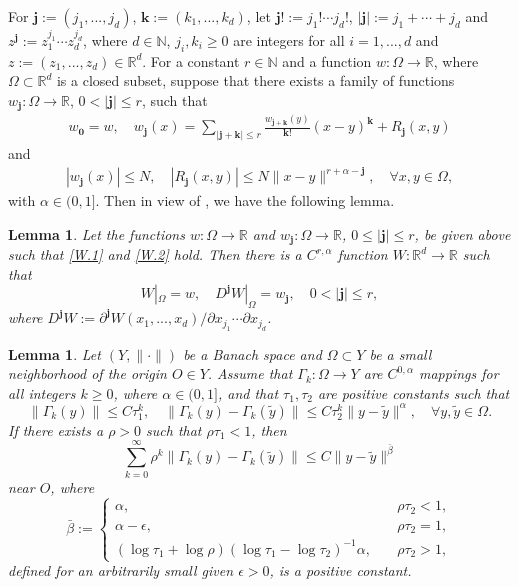 \documentclass[reqno]{amsart}
\numberwithin{equation}{section}
\newtheorem{lemma}[theorem]{Lemma}
\begin{document}
For $\mathbf{j}:=(j_1,...,j_d)$, $\mathbf{k}:=(k_1,...,k_d)$,
let $\mathbf{j}!:=j_1 ! \cdots j_d !$, $|\mathbf{j}|:=j_1+\cdots +j_d$
and $z^{\mathbf{j}}:=z_1^{j_1}\cdots z_d^{j_d}$, where $d\in\mathbb{N}$,
$j_i,k_i\ge 0$ are integers for all $i=1,...,d$ and $z:=(z_1,...,z_d)\in\mathbb{R}^d$.
For a constant $r\in\mathbb{N}$ and a function $w:\Omega \to \mathbb{R}$, where $\Omega\subset\mathbb{R}^d$ is a closed subset,
suppose that there exists a family of functions $w_{\mathbf{j}}:\Omega\to \mathbb{R}$, $0<|\mathbf{j}|\le r$, such that
\begin{align}\label{W.1} 
 w_{\mathbf{0}}=w, \quad w_{\mathbf{j}}(x)=\sum_{|\mathbf{j}+\mathbf{k}|\le r} \frac{w_{\mathbf{j}+\mathbf{k}}(y)}{\mathbf{k}!}(x-y)^{\mathbf{k}}+R_{\mathbf{j}}(x,y)
\end{align}
and
\begin{align}\label{W.2} 
  |w_{\mathbf{j}}(x) | \le N, \quad    |R_{\mathbf{j}}(x,y)|\le N \|x-y\|^{r+\alpha-\mathbf{j}}, \quad \forall x,y\in \Omega,
\end{align}
with $\alpha\in (0,1]$. Then in view of \cite[Theorem 4]{St-Book}, we have the following lemma.

\begin{lemma}\label{Exten-lem}
Let the functions $w:\Omega\to \mathbb{R}$ and $w_{\mathbf{j}}:\Omega\to \mathbb{R}$, $0\le |\mathbf{j}| \le r$, be given above such that \eqref{W.1} and \eqref{W.2} hold. Then there is a $C^{r,\alpha}$ function $W:\mathbb{R}^d \to \mathbb{R}$ such that
$$
W|_{\Omega}=w, \quad D^{\mathbf{j}}W|_{\Omega}=w_{\mathbf{j}}, \quad 0<|\mathbf{j}|\le r,
$$
where $D^{\mathbf{j}}W:=\partial^{\mathbf{j}}W(x_1,...,x_d)/\partial x_{j_1}\cdots \partial x_{j_d}$.
\end{lemma}


\begin{lemma}\label{Holder-lem}\cite[Lemma 4]{ZZJ-MA}
Let $(Y,\|\cdot\|)$ be a Banach space and $\Omega\subset Y$ be a small neighborhood of the origin $O\in Y$.
Assume that $\Gamma_k:\Omega\to Y$ are $C^{0,\alpha}$ mappings for all integers $k\ge 0$, where $\alpha\in (0,1]$, and that $\tau_1,\tau_2$ are
positive constants such that
$$
\|\Gamma_k(y)\| \le C \tau_1^k, \quad \|\Gamma_k(y)-\Gamma_k(\tilde{y})\| \le C \tau_2^k \|y-\tilde{y}\|^\alpha, \quad \forall y,\tilde{y}\in \Omega.
$$
If there exists a $\rho>0$ such that $\rho\tau_1<1$, then
$$
\sum_{k=0}^\infty \rho^k \|\Gamma_k(y)-\Gamma_k(\tilde{y})\| \le C \|y-\tilde{y}\|^{\bar{\beta}}
$$
near $O$, where
$$
\bar{\beta}:=
\begin{cases}
\alpha, \quad &\rho\tau_2<1,
\\
\alpha-\epsilon, \quad & \rho\tau_2=1,
\\
(\log\tau_1+\log\rho)(\log\tau_1-\log\tau_2)^{-1}\alpha, \quad & \rho\tau_2>1,
\end{cases}
$$
defined for an arbitrarily small given $\epsilon>0$, is a positive constant.
\end{lemma}
\end{document}
